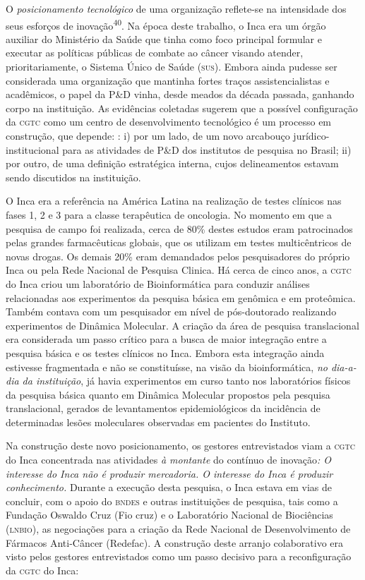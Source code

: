 \documentclass{article}
\begin{document}
O \textit{posicionamento tecnológico}
de uma organização reflete-se na intensidade dos seus esforços de
inovação\textsuperscript{40}. Na época deste trabalho, o Inca era um órgão auxiliar do Ministério da Saúde
que tinha como foco principal formular e executar as políticas públicas de
combate ao câncer visando atender, prioritariamente, o Sistema Único de Saúde
(\textsc{sus}). Embora ainda pudesse ser considerada uma organização que mantinha fortes
traços assistencialistas e acadêmicos, o papel da P\&D vinha, desde meados da
década passada, ganhando corpo na instituição. As evidências coletadas sugerem
que a possível configuração da \textsc{cgtc} como um centro de desenvolvimento
tecnológico é um processo em construção, que depende: : i) por um lado, de um
novo arcabouço jurídico-institucional para as atividades de P\&D dos institutos
de pesquisa no Brasil; ii) por outro, de uma definição estratégica interna,
cujos delineamentos estavam sendo discutidos na instituição.

O Inca era a referência na América Latina na realização de testes clínicos nas
fases 1, 2 e 3 para a classe terapêutica de oncologia. No momento em que a
pesquisa de campo foi realizada, cerca de 80\% destes estudos eram patrocinados
pelas grandes farmacêuticas globais, que os utilizam em testes multicêntricos de
novas drogas. Os demais 20\% eram demandados pelos pesquisadores do próprio Inca
ou pela Rede Nacional de Pesquisa Clinica. Há cerca de cinco anos, a \textsc{cgtc} do
Inca criou um laboratório de Bioinformática para conduzir análises relacionadas
aos experimentos da pesquisa básica em genômica e em proteômica. Também contava
com um pesquisador em nível de pós-doutorado realizando experimentos de Dinâmica
Molecular. A criação da área de pesquisa translacional era considerada um passo
crítico para a busca de maior integração entre a pesquisa básica e os testes
clínicos no Inca. Embora esta integração ainda estivesse fragmentada e não se
constituísse, na visão da bioinformática, \textit{no dia-a-dia da instituição}, já havia experimentos em curso tanto nos laboratórios físicos da pesquisa
básica quanto em Dinâmica Molecular propostos pela pesquisa translacional,
gerados de levantamentos epidemiológicos da incidência de determinadas lesões
moleculares observadas em pacientes do Instituto.

Na construção deste novo posicionamento, os gestores entrevistados viam a \textsc{cgtc}
do Inca concentrada nas atividades \textit{à montante}
do contínuo de inovação\textit{: O interesse do Inca não é produzir mercadoria.
O interesse do Inca é produzir conhecimento.}
Durante a execução desta pesquisa, o Inca estava em vias de concluir, com o
apoio do \textsc{bndes} e outras instituições de pesquisa, tais como a Fundação Oswaldo
Cruz (Fio cruz) e o Laboratório Nacional de Biociências (\textsc{lnbio}), as negociações
para a criação da Rede Nacional de Desenvolvimento de Fármacos Anti-Câncer
(Redefac). A construção deste arranjo colaborativo era visto pelos gestores
entrevistados como um passo decisivo para a reconfiguração da \textsc{cgtc} do Inca:
\end{document}

